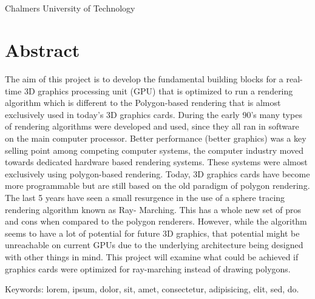 \varHeadline\\
\varSubtitle\\
\varNames\\
\varDepartment\\
Chalmers University of Technology \setlength{\parskip}{0.5cm}

\thispagestyle{plain}			%
\setlength{\parskip}{0pt plus 1.0pt}
\section*{Abstract}
The aim of this project is to develop the fundamental building blocks for a real-
time 3D graphics processing unit (GPU) that is optimized to run a rendering 
algorithm which is different to the Polygon-based rendering that is almost 
exclusively used in today's 3D graphics cards. During the early 90’s many types of 
rendering algorithms were developed and used, since they all ran in software on the 
main computer processor. Better performance (better graphics) was a key selling 
point among competing computer systems, the computer industry moved towards 
dedicated hardware based rendering systems. These systems were almost exclusively 
using polygon-based rendering. Today, 3D graphics cards have become more 
programmable but are still based on the old paradigm of polygon rendering. The last 
5 years have seen a small resurgence in the use of a sphere tracing rendering 
algorithm known as Ray- Marching. This has a whole new set of pros and cons when 
compared to the polygon renderers.  However, while the algorithm seems to have a lot 
of potential for future 3D graphics, that potential might be unreachable on current 
GPUs due to the underlying architecture being designed with other things in mind. 
This project will examine what could be achieved if graphics cards were optimized 
for ray-marching instead of drawing polygons.  

\vfill
Keywords: lorem, ipsum, dolor, sit, amet, consectetur, adipisicing, elit, sed, do.

\newpage				%
\thispagestyle{empty}
\mbox{}
